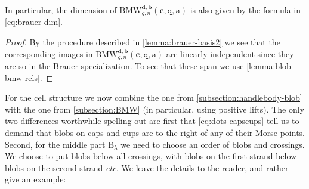 \documentclass[a4paper,11pt]{amsart}
\newcommand{\etc}{\textsl{etc.}}
\newcommand{\setstuff}[1]{\mathrm{#1}}
\newcommand{\bsym}[1]{\boldsymbol{#1}}
\newcommand{\varsym}[1]{\mathtt{#1}}
\newcommand{\qvar}{\varsym{q}}
\newcommand{\cpar}{\bsym{c}}
\newcommand{\bpar}{\bsym{b}}
\newcommand{\dpar}{\bsym{d}}
\newcommand{\avar}{\varsym{a}}
\numberwithin{equation}{section}
\let\fullref\autoref
\begin{document}
In particular, the dimension of  $\setstuff{BMW}_{g,n}^{\dpar,\bpar}(\cpar,\qvar,\avar)$
is also given by the formula in \eqref{eq:brauer-dim}.

\begin{proof}
By the procedure described in 
\fullref{lemma:brauer-basis2} we see that the 
corresponding images in 
$\setstuff{BMW}_{g,n}^{\dpar,\bpar}(\cpar,\qvar,\avar)$ are
linearly independent since they are so in the Brauer 
specialization. To see that these span we use 
\fullref{lemma:blob-bmw-rels}.
\end{proof}

For the cell structure we now combine 
the one from \fullref{subsection:handlebody-blob} with the 
one from \fullref{subsection:BMW} 
(in particular, using positive lifts). The only two
differences worthwhile spelling out are first 
that \eqref{eq:dots-capscups} 
tell us to demand that blobs on caps and cups are 
to the right of any of their Morse points. 
Second, for the middle part $\setstuff{B}_{\lambda}$ 
we need to choose an order of  blobs and crossings. We choose 
to put blobs below all crossings, with blobs on the first strand 
below blobs on the second strand {\etc}
We leave the details to the reader, and rather give an example:
\end{document}
